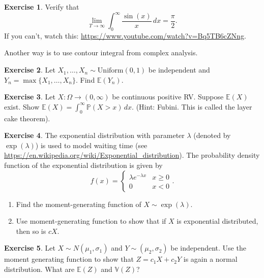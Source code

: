 \documentclass[
  openany]{book}
\theoremstyle{definition}
\theoremstyle{definition}
\theoremstyle{definition}
\newtheorem{exercise}{Exercise}[chapter]
\theoremstyle{definition}
\theoremstyle{remark}
\begin{document}
\begin{exercise}
Verify that
\[\lim_{T \to \infty} \int_0^\infty \frac{\sin(x)}{x} \, dx = \frac{\pi}{2}.\]
If you can't, watch this:
\url{https://www.youtube.com/watch?v=Bq5TB6cZNng}.

Another way is to use contour integral from complex analysis.
\end{exercise}

\begin{exercise}
Let \(X_1, \dots, X_n \sim \mathrm{Uniform}(0,1)\) be independent and \(Y_n = \max\{ X_1, \dots, X_n \}\).
Find \(\mathbb{E}(Y_n)\).
\end{exercise}

\begin{exercise}
Let \(X:\Omega \to (0,\infty)\) be continuous positive RV. Suppose \(\mathbb{E}(X)\) exist.
Show
\(\mathbb{E}(X) = \int_0^\infty \mathbb{P}(X > x) \, dx\).
(Hint: Fubini. This is called the layer cake theorem).
\end{exercise}

\begin{exercise}

The exponential distribution with parameter \(\lambda\) (denoted by \(\exp(\lambda)\))
is used to model waiting time (see \url{https://en.wikipedia.org/wiki/Exponential_distribution}).
The probability density function of the exponential distribution is given by
\[f(x) = \begin{cases} \lambda e^{-\lambda x} & x\geq 0 \\ 0 & x< 0 \end{cases}.\]

\begin{enumerate}
\def\labelenumi{\arabic{enumi}.}
\item
  Find the moment-generating function of \(X \sim \exp(\lambda)\).
\item
  Use moment-generating function to show that if \(X\) is exponential distributed,
  then so is \(cX\).
\end{enumerate}

\end{exercise}

\begin{exercise}
Let \(X \sim N(\mu_1, \sigma_1)\) and \(Y \sim (\mu_2, \sigma_2)\) be independent.
Use the moment generating function to show that \(Z = c_1 X + c_2 Y\) is again a normal distribution.
What are \(\mathbb{E}(Z)\) and \(\mathbb{V}(Z)\)?
\end{exercise}
\end{document}

